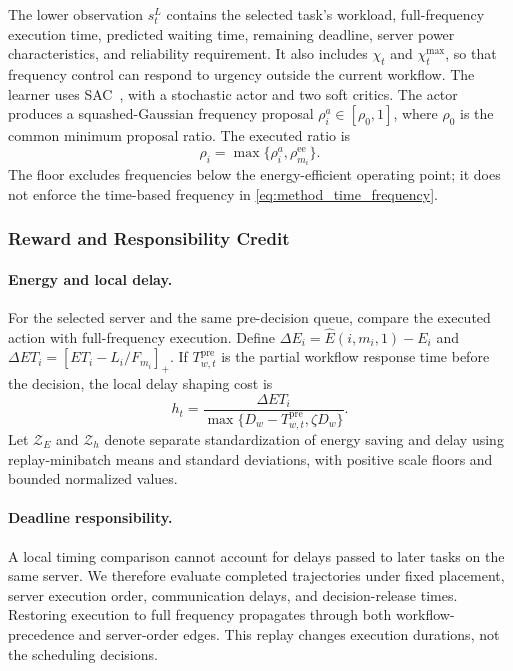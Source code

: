 \documentclass[lettersize,journal]{IEEEtran}
\begin{document}
The lower observation $s_t^L$ contains the selected task's workload,
full-frequency execution time, predicted waiting time, remaining
deadline, server power characteristics, and reliability requirement.
It also includes $\chi_t$ and $\chi_t^{\max}$, so that frequency control
can respond to urgency outside the current workflow.
The learner uses SAC~\cite{haarnoja2018}, with a stochastic actor
and two soft critics. The actor produces a squashed-Gaussian
frequency proposal $\rho_i^a\in[\rho_0,1]$, where $\rho_0$ is the
common minimum proposal ratio. The executed ratio is
\begin{equation}
 \rho_i=\max\{\rho_i^a,\rho_{m_i}^{\mathrm{ee}}\}.
 \label{eq:method_frequency_floor}
\end{equation}
The floor excludes frequencies below the energy-efficient operating point; it
does not enforce the time-based frequency in
\eqref{eq:method_time_frequency}.

\subsubsection{Reward and Responsibility Credit}

\paragraph{Energy and local delay.}
For the selected server and the same pre-decision queue, compare the
executed action with full-frequency execution. Define
$\Delta E_i=\widehat E(i,m_i,1)-E_i$ and
$\Delta ET_i=[ET_i-L_i/F_{m_i}]_+$.
If $T_{w,t}^{\mathrm{pre}}$ is the partial workflow response time before
the decision, the local delay shaping cost is
\begin{equation}
 h_t=\frac{\Delta ET_i}{\max\{D_w-T_{w,t}^{\mathrm{pre}},\zeta D_w\}}.
 \label{eq:method_local_delay}
\end{equation}
Let $\mathcal Z_E$ and $\mathcal Z_h$ denote separate standardization
of energy saving and delay using replay-minibatch means and standard
deviations, with positive scale floors and bounded normalized values.

\paragraph{Deadline responsibility.}
A local timing comparison cannot account for delays passed to later
tasks on the same server. We therefore evaluate completed trajectories
under fixed placement, server execution order, communication delays,
and decision-release times. Restoring execution to full frequency
propagates through both workflow-precedence and server-order edges.
This replay changes execution durations, not the scheduling decisions.
\end{document}
